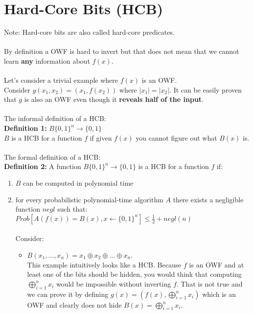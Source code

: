 \documentclass[oneside,a4paper,12pt]{book}
\begin{document}
\section{Hard-Core Bits (HCB)}
Note: Hard-core bits are also called hard-core predicates.\\\\
By definition a OWF is hard to invert but that does not mean that we cannot learn \textbf{any} information about $f(x)$.\\\\
Let's consider a trivial example where $f(x)$ is an OWF.\\
Consider $g(x_1, x_2) = (x_1,f(x_2)) \text{ where } |x_1|=|x_2|$. It can be easily proven that $g$ is also an OWF even though it \textbf{reveals half of the input}.\\\\
The informal definition of a HCB:\\
\textbf{Definition 1:} $B\{0,1\}^n \rightarrow \{ 0,1 \}$\\
$B$ is a HCB for a function $f$ if given $f(x)$ you cannot figure out what $B(x)$ is.\\\\
The formal definition of a HCB:\\
\textbf{Definition 2:} A function $B\{0,1\}^n\rightarrow\{0,1\}$ is a HCB for a function $f$ if:
\begin{enumerate}
\item $B$ can be computed in polynomial time
\item for every probabilistic polynomial-time algorithm $A$ there exists a negligible function $negl$ such that:\\
$Prob[A(f(x))=B(x), x\gets\{0,1\}^n]\leq \frac{1}{2} + negl(n)$\\\\
Consider:
\begin{itemize}
\item $B(x_1,\ldots,x_n)=x_1 \oplus x_2 \oplus \ldots \oplus x_n$.\\
This example intuitively looks like a HCB. Because $f$ is an OWF and at least one of the bits should be hidden, you would think that computing $\bigoplus^n_{i=1}x_i$ would be impossible without inverting $f$. 
That is not true and we can prove it by defining $g(x)=(f(x), \bigoplus^n_{i=1}x_i)$ which is an OWF and clearly does not hide $B(x) = \bigoplus^n_{i=1}x_i$.\\ 
\end{itemize}
\end{enumerate}
\end{document}
